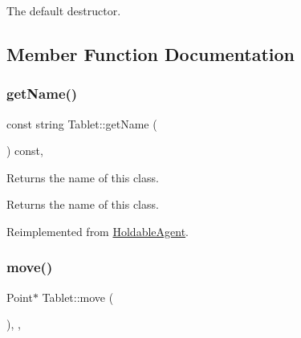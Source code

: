 The default destructor. 

\subsection{Member Function Documentation}
\mbox{\label{class_tablet_adc7196aaee1e9714236b7cd8825d5826}} 
\subsubsection{\texorpdfstring{get\+Name()}{getName()}}
{\footnotesize\ttfamily const string Tablet\+::get\+Name (\begin{DoxyParamCaption}{ }\end{DoxyParamCaption}) const\hspace{0.3cm}{\ttfamily [override]}, {\ttfamily [virtual]}}

Returns the name of this class. \begin{DoxyReturn}{Returns}
the name of this class. 
\end{DoxyReturn}


Reimplemented from \hyperlink{class_holdable_agent_ab330bb40de51a957ef8826af629f94a2}{Holdable\+Agent}.

\mbox{\label{class_tablet_ab1b8c7591be0c6ea118c8ab1c17839bb}} 
\subsubsection{\texorpdfstring{move()}{move()}}
{\footnotesize\ttfamily Point$\ast$ Tablet\+::move (\begin{DoxyParamCaption}{ }\end{DoxyParamCaption})\hspace{0.3cm}{\ttfamily [inline]}, {\ttfamily [override]}, {\ttfamily [virtual]}}

